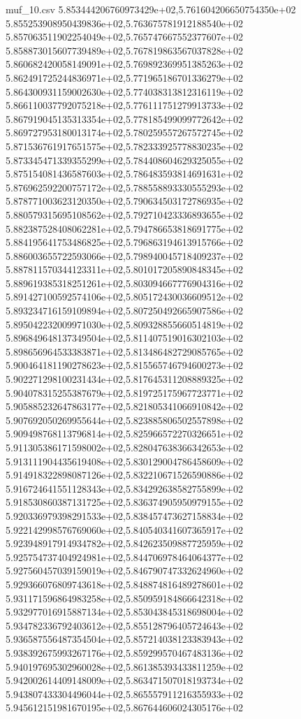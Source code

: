 \begin{filecontents*}{muf_10.csv}
5.853444206760973429e+02,5.761604206650754350e+02
5.855253908950439836e+02,5.763675781912188540e+02
5.857063511902254049e+02,5.765747667552377607e+02
5.858873015607739489e+02,5.767819863567037828e+02
5.860682420058149091e+02,5.769892369951385263e+02
5.862491725244836971e+02,5.771965186701336279e+02
5.864300931159002630e+02,5.774038313812316119e+02
5.866110037792075218e+02,5.776111751279913733e+02
5.867919045135313354e+02,5.778185499099772642e+02
5.869727953180013174e+02,5.780259557267572745e+02
5.871536761917651575e+02,5.782333925778830235e+02
5.873345471339355299e+02,5.784408604629325055e+02
5.875154081436587603e+02,5.786483593814691631e+02
5.876962592200757172e+02,5.788558893330555293e+02
5.878771003623120350e+02,5.790634503172786935e+02
5.880579315695108562e+02,5.792710423336893655e+02
5.882387528408062281e+02,5.794786653818691775e+02
5.884195641753486825e+02,5.796863194613915766e+02
5.886003655722593066e+02,5.798940045718409237e+02
5.887811570344123311e+02,5.801017205890848345e+02
5.889619385318251261e+02,5.803094667776904316e+02
5.891427100592574106e+02,5.805172430036609512e+02
5.893234716159109894e+02,5.807250492665907586e+02
5.895042232009971030e+02,5.809328855660514819e+02
5.896849648137349504e+02,5.811407519016302103e+02
5.898656964533383871e+02,5.813486482729085765e+02
5.900464181190278623e+02,5.815565746794600273e+02
5.902271298100231434e+02,5.817645311208889325e+02
5.904078315255387679e+02,5.819725175967723771e+02
5.905885232647863177e+02,5.821805341066910842e+02
5.907692050269955644e+02,5.823885806502557898e+02
5.909498768113796814e+02,5.825966572270326651e+02
5.911305386171598002e+02,5.828047638366342653e+02
5.913111904435619408e+02,5.830129004786458609e+02
5.914918322898087126e+02,5.832210671526590886e+02
5.916724641551128343e+02,5.834292638582755899e+02
5.918530860387131725e+02,5.836374905950979155e+02
5.920336979398291533e+02,5.838457473627158834e+02
5.922142998576769060e+02,5.840540341607365917e+02
5.923948917914934782e+02,5.842623509887725959e+02
5.925754737404924981e+02,5.844706978464064377e+02
5.927560457039159019e+02,5.846790747332624960e+02
5.929366076809743618e+02,5.848874816489278601e+02
5.931171596864983258e+02,5.850959184866642318e+02
5.932977016915887134e+02,5.853043845318698004e+02
5.934782336792403612e+02,5.855128796405724643e+02
5.936587556487354504e+02,5.857214038123383943e+02
5.938392675993267176e+02,5.859299570467483136e+02
5.940197695302960028e+02,5.861385393433811259e+02
5.942002614409148009e+02,5.863471507018193734e+02
5.943807433304496044e+02,5.865557911216355933e+02
5.945612151981670195e+02,5.867644606024305176e+02

\end{filecontents*}
